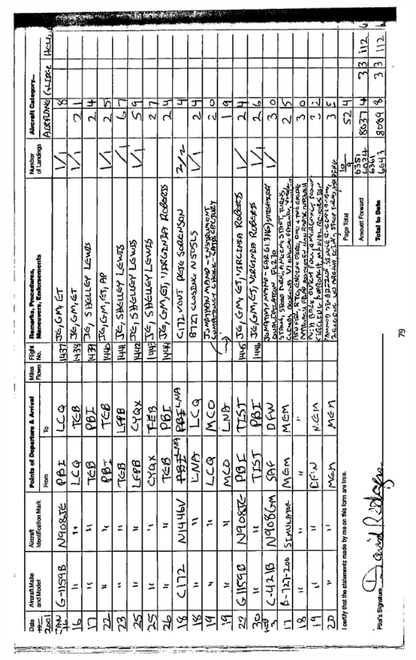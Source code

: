 \documentclass[10pt]{article}
\begin{document}
\includegraphics[max width=\textwidth, center]{2025_02_27_dd68c3d38de88f0516d9g-083}\\
\end{document}
